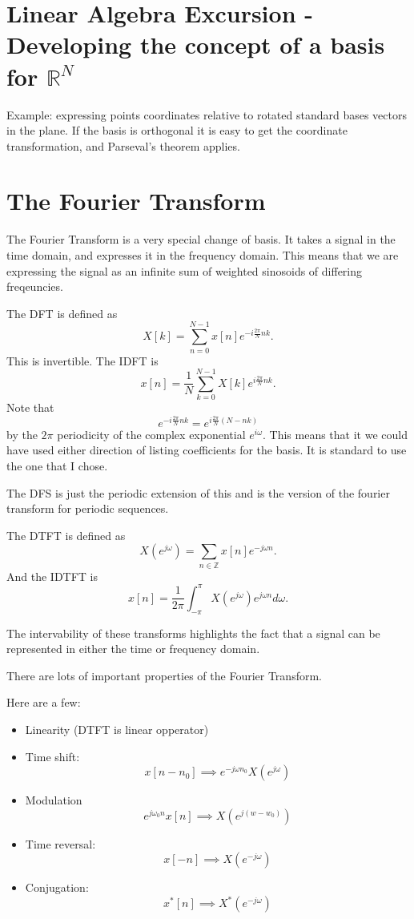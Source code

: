 \documentclass{article}[11pt]
\begin{document}
\section{Linear Algebra Excursion - Developing the concept of a basis for $\mathbb{R}^N$}
Example: expressing points coordinates relative to rotated standard bases vectors in the plane.
If the basis is orthogonal it is easy to get the coordinate transformation, and Parseval's theorem applies.

\section{The Fourier Transform}
The Fourier Transform is a very special change of basis. It takes a signal in the time domain, and expresses it in the frequency domain.
This means that we are expressing the signal as an infinite sum of weighted sinosoids of differing freqeuncies.

The DFT is defined as 
$$X[k] = \sum_{n=0}^{N-1} x[n] e^{-i\frac{2\pi}{N}nk}.$$
This is invertible. The IDFT is 
$$x[n] = \frac{1}{N}\sum_{k=0}^{N-1} X[k] e^{i\frac{2\pi}{N}nk}.$$
Note that $$e^{-i\frac{2\pi}{N}nk} = e^{i\frac{2\pi}{N} (N-nk)}$$
by the $2\pi$ periodicity of the complex exponential $e^{i\omega}$.
This means that it we could have used either direction of listing coefficients for the basis.
It is standard to use the one that I chose.

The DFS is just the periodic extension of this and is the version of the fourier transform for periodic sequences.

The DTFT is defined as 
$$X(e^{j\omega}) = \sum_{n\in\mathbb{Z}} x[n] e^{-j\omega n}.$$
And the IDTFT is 
$$x[n] = \frac{1}{2\pi}\int_{-\pi}^\pi X(e^{j\omega}) e^{j\omega n} d\omega.$$

The intervability of these transforms highlights the fact that a signal can be represented in either the time or frequency domain.

There are lots of important properties of the Fourier Transform.

Here are a few:
\begin{itemize}
	\item Linearity (DTFT is linear opperator)
	\item Time shift: $$x[n-n_0] \implies e^{-j\omega n_0} X(e^{j\omega})$$
	\item Modulation $$e^{j \omega_0 n}x[n] \implies X(e^{j(w-w_0)})$$
	\item Time reversal: $$x[-n] \implies X(e^{-j\omega})$$
	\item Conjugation: $$x^*[n] \implies X^*(e^{-j\omega})$$
\end{itemize}
\end{document}
